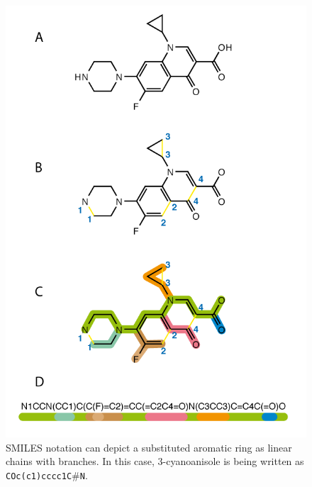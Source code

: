\begin{figure}[H]
	\begin{center}
	\includegraphics[height=0.9\textheight]{./figures/02/smiles.png}
	\end{center}
	\cprotect\caption[SMILES notation]{SMILES notation can depict a substituted aromatic ring as linear chains with branches. In this case, 3-cyanoanisole is being written as \texttt{COc(c1)cccc1C$\# $N}.}
	\label{fig:smiles}
\end{figure}


